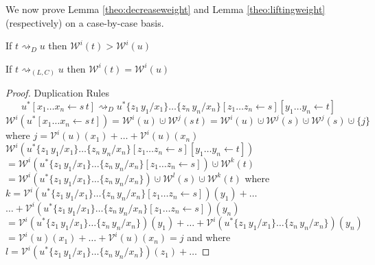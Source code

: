\documentclass[a4paper,UKenglish,cleveref, autoref]{lipics-v2019}
\newcommand{\set}[1]{ \{ #1 \} }
\newcommand{\app}[2]{#1 \, #2}
\newcommand{\share}[3]{#1 [#2 \leftarrow #3]}
\newcommand{\sub}[3]{#1 \{ #2 / #3 \}}
\newcommand{\weight}[2]{\mathcal{W}^{#1}(#2)}
\newcommand{\weightvar}[2]{\mathcal{V}^{#1}(#2)}
\begin{document}
We now prove Lemma \ref{theo:decreaseweight} and Lemma  \ref{theo:liftingweight} (respectively) on a case-by-case basis.
\begin{center}
If $t \rightsquigarrow_{D} u$ then $\weight{i}{t} > \weight{i}{u}$
\end{center}

\begin{center} 
If $t \rightsquigarrow_{(L, C)} u$ then $\weight{i}{t} = \weight{i}{u}$
\end{center}

\begin{proof}
Duplication Rules
\newline
$$\share{u^{*}}{x_{1} \dots x_{n}}{\app{s}{t}} \rightsquigarrow_{D} \share{\share{\sub{\sub{u^{*}}{\app{z_{1}}{y_{1}}}{x_{1}}\dots}{\app{z_{n}}{y_{n}}}{x_{n}}}{z_{1} \dots z_{n}}{s}}{y_{1} \dots y_{n}}{t}$$
$\weight{i}{\share{u^{*}}{x_{1} \dots x_{n}}{\app{s}{t}}} = \weight{i}{u} \cupdot \weight{j}{\app{s}{t}}
= \weight{i}{u} \cupdot \weight{j}{s} \cupdot \weight{j}{s} \cupdot \set{j}$
\newline
where $j = \weightvar{i}{u}(x_{1}) + \dots + \weightvar{i}{u}(x_{n})$
\newline
$\weight{i}{\share{\share{\sub{\sub{u^{*}}{\app{z_{1}}{y_{1}}}{x_{1}}\dots}{\app{z_{n}}{y_{n}}}{x_{n}}}{z_{1} \dots z_{n}}{s}}{y_{1} \dots y_{n}}{t}}$
\newline
$= \weight{i}{\share{\sub{\sub{u^{*}}{\app{z_{1}}{y_{1}}}{x_{1}}\dots}{\app{z_{n}}{y_{n}}}{x_{n}}}{z_{1} \dots z_{n}}{s}} \cupdot \weight{k}{t}$
\newline
$= \weight{i}{\sub{\sub{u^{*}}{\app{z_{1}}{y_{1}}}{x_{1}}\dots}{\app{z_{n}}{y_{n}}}{x_{n}}} \cupdot \weight{l}{s} \cupdot \weight{k}{t}$
\newline
where $k = \weightvar{i}{\share{\sub{\sub{u^{*}}{\app{z_{1}}{y_{1}}}{x_{1}}\dots}{\app{z_{n}}{y_{n}}}{x_{n}}}{z_{1} \dots z_{n}}{s}}(y_{1}) + \dots$
\newline
\indent $\dots + \weightvar{i}{\share{\sub{\sub{u^{*}}{\app{z_{1}}{y_{1}}}{x_{1}}\dots}{\app{z_{n}}{y_{n}}}{x_{n}}}{z_{1} \dots z_{n}}{s}}(y_{n})$
\newline
$= \weightvar{i}{\sub{\sub{u^{*}}{\app{z_{1}}{y_{1}}}{x_{1}}\dots}{\app{z_{n}}{y_{n}}}{x_{n}}}(y_{1}) + \dots + \weightvar{i}{\sub{\sub{u^{*}}{\app{z_{1}}{y_{1}}}{x_{1}}\dots}{\app{z_{n}}{y_{n}}}{x_{n}}}(y_{n})$
\newline
$= \weightvar{i}{u}(x_{1}) + \dots + \weightvar{i}{u}(x_{n}) = j$
\newline
and where $l = \weightvar{i}{\sub{\sub{u^{*}}{\app{z_{1}}{y_{1}}}{x_{1}}\dots}{\app{z_{n}}{y_{n}}}{x_{n}}}(z_{1}) + \dots$

\end{proof}
\end{document}
